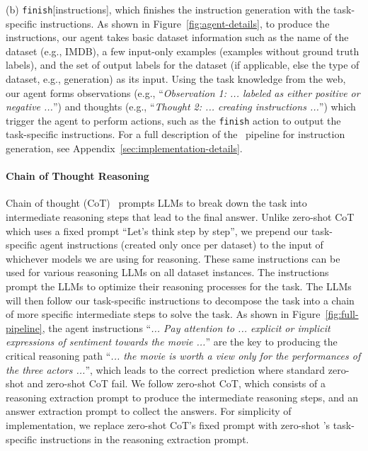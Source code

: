 (b) \texttt{finish}[instructions], which finishes the instruction generation with the task-specific instructions. As shown in Figure~\ref{fig:agent-details}, to produce the instructions, our agent takes basic dataset information such as the name of the dataset (e.g., IMDB), a few input-only examples (examples without ground truth labels), and the set of output labels for the dataset (if applicable, else the type of dataset, e.g., generation) as its input. Using the task knowledge from the web, our agent forms observations (e.g., ``\textit{Observation 1: ... labeled as either positive or negative ...}'') and thoughts (e.g., ``\textit{Thought 2: ... creating instructions ...}'') which trigger the agent to perform actions, such as the \texttt{finish} action to output the task-specific instructions. For a full description of the \method\ pipeline for instruction generation, see Appendix~\ref{sec:implementation-details}.

\paragraph{Chain of Thought Reasoning} Chain of thought (CoT)~\citep{wei2023chainofthought, kojima2023large} prompts LLMs to break down the task into intermediate reasoning steps that lead to the final answer. Unlike zero-shot CoT which uses a fixed prompt ``Let's think step by step'', we prepend our task-specific agent instructions (created only once per dataset) to the input of whichever models we are using for reasoning. These same instructions can be used for various reasoning LLMs on all dataset instances. The instructions prompt the LLMs to optimize their reasoning processes for the task. The LLMs will then follow our task-specific instructions to decompose the task into a chain of more specific intermediate steps to solve the task. As shown in Figure~\ref{fig:full-pipeline}, the agent instructions ``\textit{... Pay attention to ... explicit or implicit expressions of sentiment towards the movie ...}'' are the key to producing the critical reasoning path ``\textit{... the movie is worth a view only for the performances of the three actors ...}'', which leads to the correct prediction where standard zero-shot and zero-shot CoT fail. We follow zero-shot CoT, which consists of a reasoning extraction prompt to produce the intermediate reasoning steps, and an answer extraction prompt to collect the answers. For simplicity of implementation, we replace zero-shot CoT's fixed prompt with zero-shot \method's task-specific instructions in the reasoning extraction prompt.

